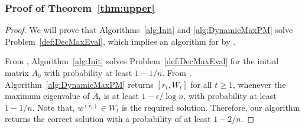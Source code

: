 \documentclass[11pt]{article}
\newcommand\ww{\boldsymbol{\mathit{w}}}
\renewcommand\AA{\boldsymbol{\mathit{A}}}
\newcommand\WW{\boldsymbol{\mathit{W}}}
\begin{document}
\subsubsection*{Proof of Theorem~\ref{thm:upper}}
\begin{proof}

We will prove that Algorithms~\ref{alg:Init} and \ref{alg:DynamicMaxPM} solve Problem~\ref{def:DecMaxEval}, which implies an algorithm for  by .

From , Algorithm~\ref{alg:Init} solves Problem~\ref{def:DecMaxEval} for the initial matrix $\AA_0$ with probability at least $1-1/n$. From , Algorithm~\ref{alg:DynamicMaxPM} returns $[r_t,\WW_t]$ for all $t\geq 1$, whenever the maximum eigenvalue of $\AA_t$ is at least $1-\epsilon/\log n$, with probability at least $1-1/n$. Note that, $\ww^{(r_t)}\in \WW_t$ is the required solution. Therefore, our algorithm returns the correct solution with a probability of at least $1-2/n$.


\end{proof}
\end{document}
